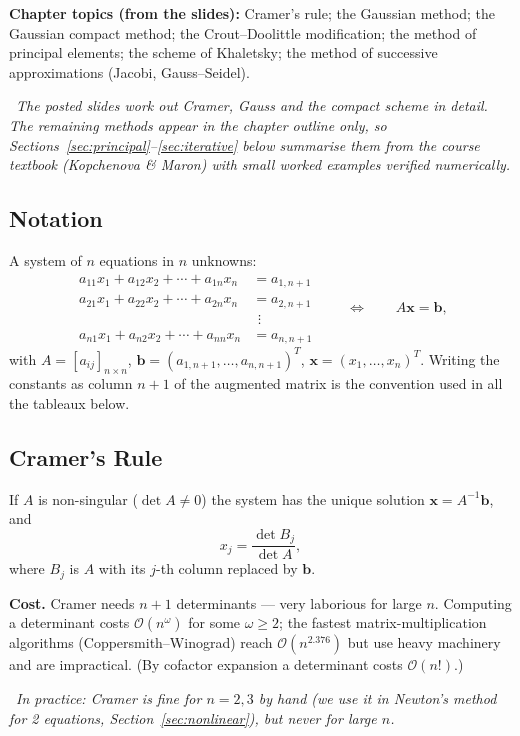 \documentclass[hidelinks]{article}
\newcommand{\callout}[1]{\par\smallskip\noindent{\color{capri}$\blacktriangleright$}\ \textit{#1}\par\smallskip}
\begin{document}
\textbf{Chapter topics (from the slides):} Cramer's rule; the Gaussian method; the Gaussian compact method; the Crout--Doolittle modification; the method of principal elements; the scheme of Khaletsky; the method of successive approximations (Jacobi, Gauss--Seidel).

\callout{The posted slides work out Cramer, Gauss and the compact scheme in detail. The remaining methods appear in the chapter outline only, so Sections~\ref{sec:principal}--\ref{sec:iterative} below summarise them from the course textbook (Kopchenova \& Maron) with small worked examples verified numerically.}

\subsection{Notation}

A system of $n$ equations in $n$ unknowns:
\[
\begin{aligned}
a_{11}x_1+a_{12}x_2+\cdots+a_{1n}x_n&=a_{1,n+1}\\
a_{21}x_1+a_{22}x_2+\cdots+a_{2n}x_n&=a_{2,n+1}\\
&\ \,\vdots\\
a_{n1}x_1+a_{n2}x_2+\cdots+a_{nn}x_n&=a_{n,n+1}
\end{aligned}
\qquad\Longleftrightarrow\qquad A\mathbf x=\mathbf b,
\]
with $A=[a_{ij}]_{n\times n}$, $\mathbf b=(a_{1,n+1},\dots,a_{n,n+1})^T$, $\mathbf x=(x_1,\dots,x_n)^T$. Writing the constants as column $n+1$ of the augmented matrix is the convention used in all the tableaux below.

\subsection{Cramer's Rule}

If $A$ is non-singular ($\det A\ne0$) the system has the unique solution $\mathbf x=A^{-1}\mathbf b$, and
\[
x_j=\frac{\det B_j}{\det A},
\]
where $B_j$ is $A$ with its $j$-th column replaced by $\mathbf b$.

\textbf{Cost.} Cramer needs $n+1$ determinants --- very laborious for large $n$. Computing a determinant costs $\mathcal O(n^\omega)$ for some $\omega\ge2$; the fastest matrix-multiplication algorithms (Coppersmith--Winograd) reach $\mathcal O(n^{2.376})$ but use heavy machinery and are impractical. (By cofactor expansion a determinant costs $\mathcal O(n!)$.)

\callout{In practice: Cramer is fine for $n=2,3$ by hand (we use it in Newton's method for 2 equations, Section~\ref{sec:nonlinear}), but never for large $n$.}
\end{document}
